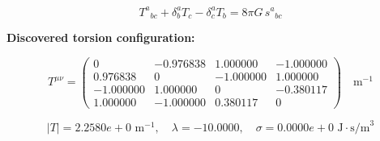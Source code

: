 
\begin{equation}
  T^a{}_{bc} + \delta^a_b T_c - \delta^a_c T_b = 8\pi G \, s^a{}_{bc}
\end{equation}

\textbf{Discovered torsion configuration:}

\begin{equation}
  T^{\mu\nu} = \begin{pmatrix}
    0 & -0.976838 & 1.000000 & -1.000000 \\
    0.976838 & 0 & -1.000000 & 1.000000 \\
    -1.000000 & 1.000000 & 0 & -0.380117 \\
    1.000000 & -1.000000 & 0.380117 & 0
  \end{pmatrix} \quad \text{m}^{-1}
\end{equation}

\begin{equation}
  |T| = 2.2580e+0 \text{ m}^{-1}, \quad
  \lambda = -10.0000, \quad
  \sigma = 0.0000e+0 \text{ J}\cdot\text{s/m}^3
\end{equation}
